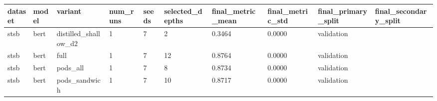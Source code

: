 \begin{tabular}{llllllllll}
\hline
dataset & model & variant & num\_runs & seeds & selected\_depths & final\_metric\_mean & final\_metric\_std & final\_primary\_split & final\_secondary\_split \\
\hline
stsb & bert & distilled\_shallow\_d2 & 1 & 7 & 2 & 0.3464 & 0.0000 & validation &  \\
stsb & bert & full & 1 & 7 & 12 & 0.8764 & 0.0000 & validation &  \\
stsb & bert & pods\_all & 1 & 7 & 8 & 0.8734 & 0.0000 & validation &  \\
stsb & bert & pods\_sandwich & 1 & 7 & 10 & 0.8717 & 0.0000 & validation &  \\
\hline
\end{tabular}
